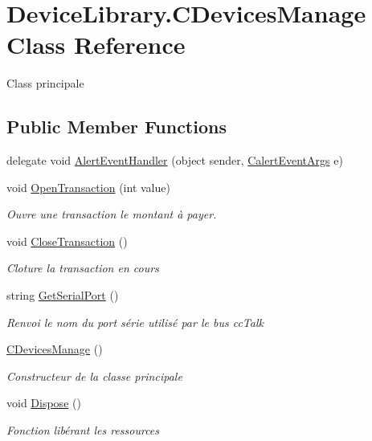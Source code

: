 \hypertarget{class_device_library_1_1_c_devices_manage}{}\section{Device\+Library.\+C\+Devices\+Manage Class Reference}
\label{class_device_library_1_1_c_devices_manage}


Class principale  


\subsection*{Public Member Functions}
\begin{DoxyCompactItemize}
\item 
delegate void \mbox{\hyperlink{class_device_library_1_1_c_devices_manage_a76f84b8a18500338f67d33123aa3332a}{Alert\+Event\+Handler}} (object sender, \mbox{\hyperlink{class_device_library_1_1_calert_event_args}{Calert\+Event\+Args}} e)
\item 
void \mbox{\hyperlink{class_device_library_1_1_c_devices_manage_a207100abcf87d3e21768d5284d84a100}{Open\+Transaction}} (int value)
\begin{DoxyCompactList}\small\item\em Ouvre une transaction le montant à payer. \end{DoxyCompactList}\item 
void \mbox{\hyperlink{class_device_library_1_1_c_devices_manage_a4bf7edbc6a2147169527ffa5b8233fc3}{Close\+Transaction}} ()
\begin{DoxyCompactList}\small\item\em Cloture la transaction en cours \end{DoxyCompactList}\item 
string \mbox{\hyperlink{class_device_library_1_1_c_devices_manage_a6b10aa601256c13d54c8c4642b029e10}{Get\+Serial\+Port}} ()
\begin{DoxyCompactList}\small\item\em Renvoi le nom du port série utilisé par le bus cc\+Talk \end{DoxyCompactList}\item 
\mbox{\hyperlink{class_device_library_1_1_c_devices_manage_a56177d99576c5d63e3233458a2a70ae1}{C\+Devices\+Manage}} ()
\begin{DoxyCompactList}\small\item\em Constructeur de la classe principale \end{DoxyCompactList}\item 
void \mbox{\hyperlink{class_device_library_1_1_c_devices_manage_a369960a1c585a85b637c7c217f927e1f}{Dispose}} ()
\begin{DoxyCompactList}\small\item\em Fonction libérant les ressources \end{DoxyCompactList}\end{DoxyCompactItemize}
